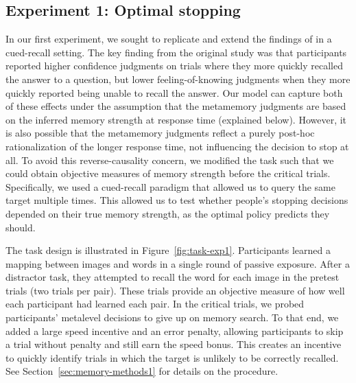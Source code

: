 \subsection{Experiment 1: Optimal stopping}

In our first experiment, we sought to replicate and extend the findings of \citet{costermans1992confidence} in a cued-recall setting. The key finding from the original study was that participants reported higher confidence judgments on trials where they more quickly recalled the answer to a question, but lower feeling-of-knowing judgments when they more quickly reported being unable to recall the answer. Our model can capture both of these effects under the assumption that the metamemory judgments are based on the inferred memory strength at response time (explained below). However, it is also possible that the metamemory judgments reflect a purely post-hoc rationalization of the longer response time, not influencing the decision to stop at all. To avoid this reverse-causality concern, we modified the task such that we could obtain objective measures of memory strength before the critical trials. Specifically, we used a cued-recall paradigm that allowed us to query the same target multiple times. This allowed us to test whether people's stopping decisions depended on their true memory strength, as the optimal policy predicts they should.

The task design is illustrated in Figure~\ref{fig:task-exp1}. Participants learned a mapping between images and words in a single round of passive exposure. After a distractor task, they attempted to recall the word for each image in the pretest trials (two trials per pair). These trials provide an objective measure of how well each participant had learned each pair. In the critical trials, we probed participants' metalevel decisions to give up on memory search. To that end, we added a large speed incentive and an error penalty, allowing participants to skip a trial without penalty and still earn the speed bonus. This creates an incentive to quickly identify trials in which the target is unlikely to be correctly recalled. See Section~\ref{sec:memory-methods1} for details on the procedure.


